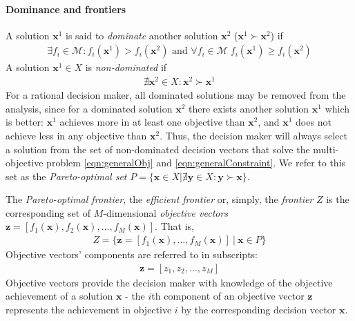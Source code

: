 \paragraph{Dominance and frontiers}
A solution $\mathbf{x}^1$ is said to \textit{dominate} another solution $\mathbf{x}^2$ ($\mathbf{x}^1 \succ \mathbf{x}^2$) if
\begin{align}
\exists f_i \in \mathcal{M} : f_i(\mathbf{x}^1) > f_i(\mathbf{x}^2) \text{ and } \forall f_i \in \mathcal{M} \; f_i(\mathbf{x}^1) \ge f_i(\mathbf{x}^2)
\end{align}
A solution $\mathbf{x}^1 \in X$ is \textit{non-dominated} if
\begin{align}
\nexists \mathbf{x}^2 \in X : \mathbf{x}^2 \succ \mathbf{x}^1
\end{align}
For a rational decision maker, all dominated solutions may be removed from the analysis, since for a dominated solution $\mathbf{x}^2$ there exists another solution $\mathbf{x}^1$ which is better: $\mathbf{x}^1$ achieves more in at least one objective than $\mathbf{x}^2$, and $\mathbf{x}^1$ does not achieve less in any objective than $\mathbf{x}^2$. Thus, the decision maker will always select a solution from the set of non-dominated decision vectors that solve the multi-objective problem \eqref{eqn:generalObj} and \eqref{eqn:generalConstraint}. We refer to this set as the \textit{Pareto-optimal set} $P = \{\mathbf{x} \in X | \nexists \mathbf{y} \in X : \mathbf{y} \succ \mathbf{x} \}$.

The \textit{Pareto-optimal frontier}, the \textit{efficient frontier} or, simply, the \textit{frontier} $Z$ is the corresponding set of $M$-dimensional \textit{objective vectors} $\mathbf{z} = [f_1(\mathbf{x}),f_2(\mathbf{x}),\ldots,f_M(\mathbf{x})]$. That is,
\begin{align}
Z = \{\mathbf{z} = [f_1(\mathbf{x}),\ldots,f_M(\mathbf{x})] \:|\: \mathbf{x} \in P\}
\end{align}
Objective vectors' components are referred to in subscripts:
\begin{align}
\mathbf{z} = [z_1, z_2, \ldots, z_M]
\end{align}
Objective vectors provide the decision maker with knowledge of the objective achievement of a solution $\mathbf{x}$ - the $i$th component of an objective vector $\mathbf{z}$ represents the achievement in objective $i$ by the corresponding decision vector $\mathbf{x}$.

